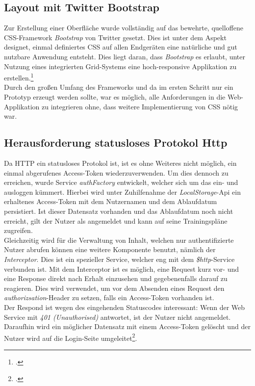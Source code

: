 \subsection{Layout mit Twitter Bootstrap}
\label{ssec:SPA-twitter-bootstrap}
Zur Erstellung einer Oberfläche wurde vollständig auf das bewehrte, quelloffene CSS-Framework \textit{Bootstrap} von Twitter gesetzt. Dies ist unter dem Aspekt designet, einmal definiertes CSS auf allen Endgeräten eine natürliche und gut nutzbare Anwendung entsteht. Dies liegt daran, dass \textit{Bootstrap} es erlaubt, unter Nutzung eines integrierten Grid-Systems eine hoch-responsive Applikation zu erstellen.\footcite{online:get-bootstrap}\\
Durch den großen Umfang des Frameworks und da im ersten Schritt nur ein Prototyp erzeugt werden sollte, war es möglich, alle Anforderungen in die Web-Applikation zu integrieren ohne, dass weitere Implementierung von CSS nötig war.

\subsection{Herausforderung statusloses Protokol Http}
\label{ssec:statusloses-http}
Da HTTP ein statusloses Protokol ist, ist es ohne Weiteres nicht möglich, ein einmal abgerufenes Access-Token wiederzuverwenden. Um dies dennoch zu erreichen, wurde Service \textit{authFactory} entwickelt, welcher sich um das ein- und ausloggen kümmert. Hierbei wird unter Zuhilfenahme der \textit{LocalStorage}-Api ein erhaltenes Access-Token mit dem Nutzernamen und dem Ablaufdatum persistiert. Ist dieser Datensatz vorhanden und das Ablaufdatum noch nicht erreicht, gilt der Nutzer als angemeldet und kann auf seine Trainingspläne zugreifen. \\
Gleichzeitig wird für die Verwaltung von Inhalt, welchen nur authentifizierte Nutzer abrufen können eine weitere Komponente benutzt, nämlich der \textit{Interceptor}. Dies ist ein spezieller Service, welcher eng mit dem \textit{\$http}-Service verbunden ist. Mit dem Interceptor ist es möglich, eine Request kurz vor- und eine Response direkt nach Erhalt einzusehen und gegebenenfalls darauf zu reagieren. Dies wird verwendet, um vor dem Absenden eines Request den \textit{authorizsation}-Header zu setzen, falls ein Access-Token vorhanden ist. \\ Der Respond ist wegen des eingehenden Statuscodes interessant: Wenn der Web Service mit \textit{401 (Unauthorised)} antwortet, ist der Nutzer nicht angemeldet. Daraufhin wird ein möglicher Datensatz mit einem Access-Token gelöscht und der Nutzer wird auf die Login-Seite umgeleitet\footcite{online:Created_SPA}. 

